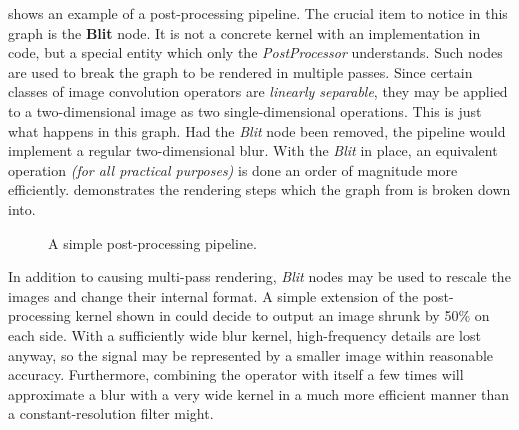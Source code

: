  shows an example of a post-processing pipeline. The crucial item to notice in this graph is the \textbf{Blit} node. It is not a concrete kernel with an implementation in code, but a special entity which only the \emph{PostProcessor} understands. Such nodes are used to break the graph to be rendered in multiple passes. Since certain classes of image convolution operators are \emph{linearly separable}, they may be applied to a two-dimensional image as two single-dimensional operations. This is just what happens in this graph. Had the \emph{Blit} node been removed, the pipeline would implement a regular two-dimensional blur. With the \emph{Blit} in place, an equivalent operation \emph{(for all practical purposes)} is done an order of magnitude more efficiently.  demonstrates the rendering steps which the graph from  is broken down into.

\begin{figure}[ht!]
  \centering
  \caption[Simple post-processing with breakdown]{A simple post-processing pipeline.}
\label{fig:SimplePostProcWithBreakdown}
\end{figure}

In addition to causing multi-pass rendering, \emph{Blit} nodes may be used to rescale the images and change their internal format. A simple extension of the post-processing kernel shown in  could decide to output an image shrunk by 50\% on each side. With a sufficiently wide blur kernel, high-frequency details are lost anyway, so the signal may be represented by a smaller image within reasonable accuracy. Furthermore, combining the operator with itself a few times will approximate a blur with a very wide kernel in a much more efficient manner than a constant-resolution filter might.

